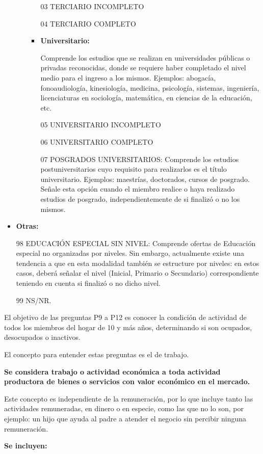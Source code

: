 \documentclass[
  openany]{book}
\begin{document}
\begin{itemize}
\begin{itemize}
\begin{itemize}
      03 TERCIARIO INCOMPLETO

      04 TERCIARIO COMPLETO
    \item
      \textbf{Universitario:}

      Comprende los estudios que se realizan en universidades públicas o privadas reconocidas, donde se requiere haber completado el nivel medio para el ingreso a los mismos. Ejemplos: abogacía, fonoaudiología, kinesiología, medicina, psicología, sistemas, ingeniería, licenciaturas en sociología, matemática, en ciencias de la educación, etc.

      05 UNIVERSITARIO INCOMPLETO

      06 UNIVERSITARIO COMPLETO

      07 POSGRADOS UNIVERSITARIOS: Comprende los estudios postuniversitarios cuyo requisito para realizarlos es el título universitario. Ejemplos: maestrías, doctorados, cursos de posgrado. Señale esta opción cuando el miembro realice o haya realizado estudios de posgrado, independientemente de si finalizó o no los mismos.
    \end{itemize}
  \end{itemize}
\item
  \textbf{Otras:}

  98 EDUCACIÓN ESPECIAL SIN NIVEL: Comprende ofertas de Educación especial no organizadas por niveles. Sin embargo, actualmente existe una tendencia a que en esta modalidad también se estructure por niveles: en estos casos, deberá señalar el nivel (Inicial, Primario o Secundario) correspondiente teniendo en cuenta si finalizó o no dicho nivel.

  99 NS/NR.
\end{itemize}

El objetivo de las preguntas P9 a P12 es conocer la condición de actividad de todos los miembros del hogar de 10 y más años, determinando si son ocupados, desocupados o inactivos.

El concepto para entender estas preguntas es el de trabajo.

\textbf{Se considera trabajo o actividad económica a toda actividad productora de bienes o servicios con valor económico en el mercado.}

Este concepto es independiente de la remuneración, por lo que incluye tanto las actividades remuneradas, en dinero o en especie, como las que no lo son, por ejemplo: un hijo que ayuda al padre a atender el negocio sin percibir ninguna remuneración.

\textbf{Se incluyen:}
\end{document}
